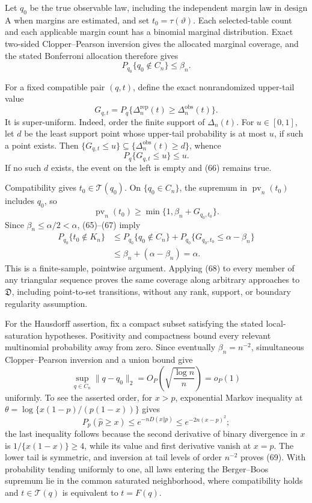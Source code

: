 Let \(q_0\) be the true observable law, including the independent margin law in design A when margins are estimated, and set \(t_0=\tau(\vartheta)\).  Each selected-table count and each applicable margin count has a binomial marginal distribution.  Exact two-sided Clopper--Pearson inversion gives the allocated marginal coverage, and the stated Bonferroni allocation therefore gives
\[
 P_{q_0}\{q_0\notin C_n\}\le\beta_n.                    \tag{65}
\]

For a fixed compatible pair \((q,t)\), define the exact nonrandomized upper-tail value
\[
 G_{q,t}=P_q\{\Delta_n^{\mathrm{rep}}(t)
                 \ge\Delta_n^{\mathrm{obs}}(t)\}.
\]
It is super-uniform.  Indeed, order the finite support of \(\Delta_n(t)\).  For \(u\in[0,1]\), let \(d\) be the least support point whose upper-tail probability is at most \(u\), if such a point exists.  Then
\(\{G_{q,t}\le u\}\subseteq\{\Delta_n^{\mathrm{obs}}(t)\ge d\}\), whence
\[
 P_q\{G_{q,t}\le u\}\le u.                              \tag{66}
\]
If no such \(d\) exists, the event on the left is empty and (66) remains true.

Compatibility gives \(t_0\in\mathcal T(q_0)\).  On \(\{q_0\in C_n\}\), the supremum in \(\operatorname{pv}_n(t_0)\) includes \(q_0\), so
\[
 \operatorname{pv}_n(t_0)
 \ge\min\{1,\beta_n+G_{q_0,t_0}\}.                       \tag{67}
\]
Since \(\beta_n\le\alpha/2<\alpha\), (65)--(67) imply
\[
 \begin{aligned}
 P_{q_0}\{t_0\notin K_n\}
 &\le P_{q_0}\{q_0\notin C_n\}
   +P_{q_0}\{G_{q_0,t_0}\le\alpha-\beta_n\}\\
 &\le\beta_n+(\alpha-\beta_n)=\alpha.
 \end{aligned}                                             \tag{68}
\]
This is a finite-sample, pointwise argument.  Applying (68) to every member of any triangular sequence proves the same coverage along arbitrary approaches to \(\mathfrak D\), including point-to-set transitions, without any rank, support, or boundary regularity assumption.

For the Hausdorff assertion, fix a compact subset satisfying the stated local-saturation hypotheses.  Positivity and compactness bound every relevant multinomial probability away from zero.  Since eventually \(\beta_n=n^{-2}\), simultaneous Clopper--Pearson inversion and a union bound give
\[
 \sup_{q\in C_n}\|q-q_0\|_2
 =O_P\!\left(\sqrt{\frac{\log n}{n}}\right)=o_P(1)      \tag{69}
\]
uniformly.  To see the asserted order, for \(x>p\), exponential Markov inequality at
\(\theta=\log\{x(1-p)/(p(1-x))\}\) gives
\[
 P_p(\widehat p\ge x)
 \le e^{-nD(x\Vert p)}
 \le e^{-2n(x-p)^2};                                      \tag{70}
\]
the last inequality follows because the second derivative of binary divergence in \(x\) is \(1/\{x(1-x)\}\ge4\), while its value and first derivative vanish at \(x=p\).  The lower tail is symmetric, and inversion at tail levels of order \(n^{-2}\) proves (69).  With probability tending uniformly to one, all laws entering the Berger--Boos supremum lie in the common saturated neighborhood, where compatibility holds and \(t\in\mathcal T(q)\) is equivalent to \(t=F(q)\).

